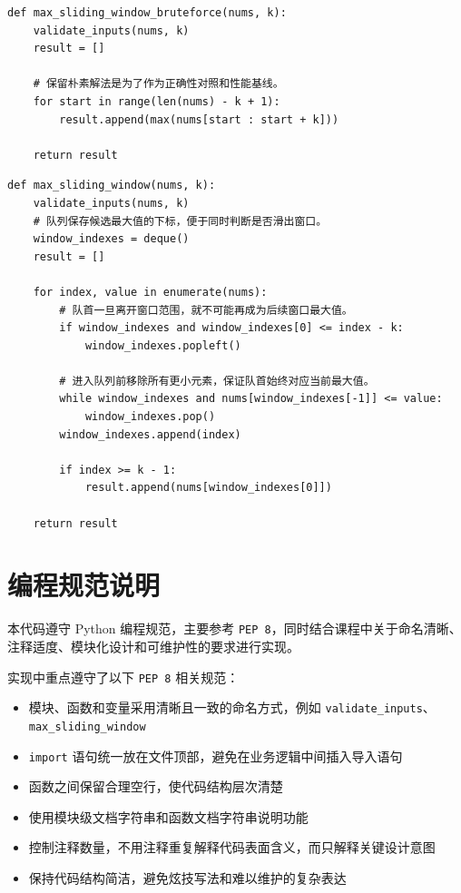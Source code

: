 \documentclass[a4paper,UTF8,fontset=none]{ctexart}
\begin{document}
\begin{lstlisting}[title=朴素解法核心循环]
def max_sliding_window_bruteforce(nums, k):
    validate_inputs(nums, k)
    result = []

    # 保留朴素解法是为了作为正确性对照和性能基线。
    for start in range(len(nums) - k + 1):
        result.append(max(nums[start : start + k]))

    return result
\end{lstlisting}

\begin{lstlisting}[title=优化解法核心循环]
def max_sliding_window(nums, k):
    validate_inputs(nums, k)
    # 队列保存候选最大值的下标，便于同时判断是否滑出窗口。
    window_indexes = deque()
    result = []

    for index, value in enumerate(nums):
        # 队首一旦离开窗口范围，就不可能再成为后续窗口最大值。
        if window_indexes and window_indexes[0] <= index - k:
            window_indexes.popleft()

        # 进入队列前移除所有更小元素，保证队首始终对应当前最大值。
        while window_indexes and nums[window_indexes[-1]] <= value:
            window_indexes.pop()
        window_indexes.append(index)

        if index >= k - 1:
            result.append(nums[window_indexes[0]])

    return result
\end{lstlisting}

\section{编程规范说明}

本代码遵守 Python 编程规范，主要参考 \texttt{PEP 8}，同时结合课程中关于命名清晰、注释适度、模块化设计和可维护性的要求进行实现。

实现中重点遵守了以下 \texttt{PEP 8} 相关规范：

\begin{itemize}
    \item 模块、函数和变量采用清晰且一致的命名方式，例如 \texttt{validate\_inputs}、\texttt{max\_sliding\_window}
    \item \texttt{import} 语句统一放在文件顶部，避免在业务逻辑中间插入导入语句
    \item 函数之间保留合理空行，使代码结构层次清楚
    \item 使用模块级文档字符串和函数文档字符串说明功能
    \item 控制注释数量，不用注释重复解释代码表面含义，而只解释关键设计意图
    \item 保持代码结构简洁，避免炫技写法和难以维护的复杂表达
\end{itemize}
\end{document}
